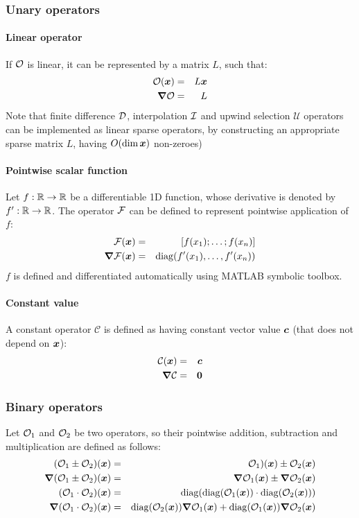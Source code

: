 \subsubsection{Unary operators}
\paragraph{Linear operator}
If $\mathcal{O}$ is linear, it can be represented by a matrix $L$, such that:
\begin{eqnarray}
\mathcal{O}(\boldsymbol{x}) &=& L \boldsymbol{x} \\
\boldsymbol{\nabla}\mathcal{O} &=& L 
\end{eqnarray}
Note that finite difference $\mathcal{D}$, interpolation $\mathcal{I}$ and 
upwind selection $\mathcal{U}$ operators
can be implemented as linear sparse operators, by constructing 
an appropriate sparse matrix $L$, having $O(\dim \boldsymbol{x})$ non-zeroes) 

\paragraph{Pointwise scalar function}
Let $f: \mathbb{R} \rightarrow \mathbb{R}$ be a differentiable 1D function, whose derivative is
denoted by $f': \mathbb{R} \rightarrow \mathbb{R}$. The operator $\mathcal{F}$ can be defined to
represent pointwise application of $f$:
\begin{eqnarray}
\mathcal{F}(\boldsymbol{x}) &=& [f(x_1); \ldots; f(x_n)] \\
\boldsymbol{\nabla}\mathcal{F}(\boldsymbol{x}) &=& \mathrm{diag}(f'(x_1), \ldots, f'(x_n))
\end{eqnarray}
$f$ is defined and differentiated automatically using MATLAB symbolic toolbox.

\paragraph{Constant value}
A constant operator $\mathcal{C}$ is defined as having constant vector value $\boldsymbol{c}$ 
(that does not depend on $\boldsymbol{x}$):
\begin{eqnarray}
\mathcal{C}(\boldsymbol{x}) &=& \boldsymbol{c} \\
\boldsymbol{\nabla}\mathcal{C} &=& \boldsymbol{0}
\end{eqnarray}

\subsubsection{Binary operators}
Let $\mathcal{O}_1$ and $\mathcal{O}_2$ be two operators, so their pointwise addition, subtraction
and multiplication are defined as follows:
\begin{eqnarray}
(\mathcal{O}_1 \pm \mathcal{O}_2)(\boldsymbol{x}) &=& \mathcal{O}_1)(\boldsymbol{x}) \pm \mathcal{O}_2(\boldsymbol{x}) \\
\boldsymbol{\nabla} (\mathcal{O}_1 \pm \mathcal{O}_2)(\boldsymbol{x})   &=& \boldsymbol{\nabla}\mathcal{O}_1(\boldsymbol{x}) \pm \boldsymbol{\nabla}\mathcal{O}_2(\boldsymbol{x}) \\
(\mathcal{O}_1 \cdot \mathcal{O}_2)(\boldsymbol{x}) &=& \mathrm{diag}(\mathrm{diag}(\mathcal{O}_1(\boldsymbol{x})) \cdot \mathrm{diag}(\mathcal{O}_2(\boldsymbol{x}))) \\
\boldsymbol{\nabla} (\mathcal{O}_1 \cdot \mathcal{O}_2)(\boldsymbol{x}) &=& \mathrm{diag}(\mathcal{O}_2(\boldsymbol{x})) \boldsymbol{\nabla}\mathcal{O}_1(\boldsymbol{x}) 
                                  + \mathrm{diag}(\mathcal{O}_1(\boldsymbol{x})) \boldsymbol{\nabla}\mathcal{O}_2(\boldsymbol{x})
\end{eqnarray}

